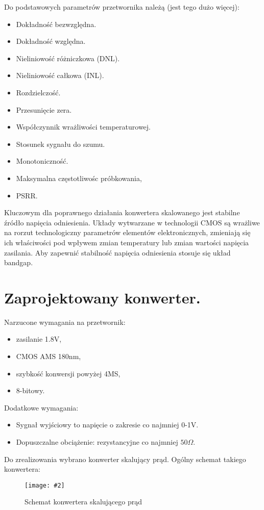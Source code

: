 \documentclass[10pt,a4paper]{report}
\newcommand{\img}[4]{
	\begin{figure}[H]
		\begin{center}
			\texttt{[image: \#2]}
			\caption{#3}
			\label{#4}
		\end{center}
	\end{figure}
}
\begin{document}
	{	Do podstawowych parametrów przetwornika należą (jest tego dużo więcej):
		\begin{itemize}
			\item Dokładność bezwzględna.
			\item Dokładność względna.
			\item Nieliniowość różniczkowa (DNL).
			\item Nieliniowość całkowa (INL). 
			\item Rozdzielczość.
			\item Przesunięcie zera.
			\item Współczynnik wrażliwości temperaturowej.
			\item Stosunek sygnału do szumu.
			\item Monotoniczność.
			\item Maksymalna częstotliwośc próbkowania,
			\item PSRR.
		\end{itemize} 
	}

	{	Kluczowym dla poprawnego działania konwertera skalowanego jest stabilne źródło napięcia odniesienia. Układy wytwarzane w technologii CMOS są wrażliwe na rorzut technologiczny parametrów elementów elektronicznych, zmieniają się ich właściwości pod wpływem zmian temperatury lub zmian wartości napięcia zasilania. Aby zapewnić stabilność napięcia odniesienia stosuje się układ bandgap. }

	\chapter{Zaprojektowany konwerter.}
	{	Narzucone wymagania na przetwornik:
		\begin{itemize}
			\item zasilanie 1.8V,
			\item CMOS AMS 180nm,
			\item szybkość konwersji powyżej 4MS,
			\item 8-bitowy.
		\end{itemize} }
	
	{	Dodatkowe wymagania:
		\begin{itemize}
			\item Sygnał wyjściowy to napięcie o zakresie co najmniej 0-1V.
			\item Dopuszczalne obciążenie: rezystancyjne co najmniej $50\Omega$.
		\end{itemize}
	}

	{	Do zrealizowania wybrano konwerter skalujący prąd. Ogólny schemat takiego konwertera:
		\img{20}{../visio/currentscale.pdf}{Schemat konwertera skalującego prąd}{currentscale}
	}
\end{document}
